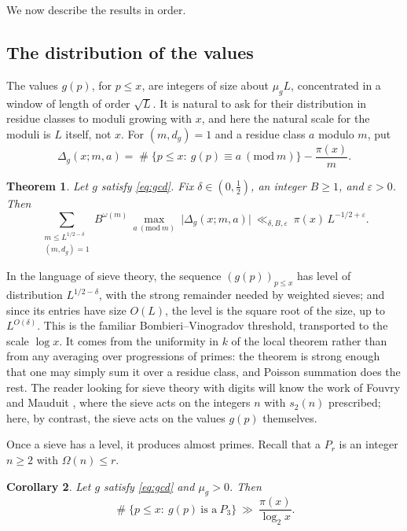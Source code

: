 \documentclass[11pt,reqno]{amsart}
\theoremstyle{plain}
\newtheorem{theorem}{Theorem}[section]
\newtheorem{corollary}[theorem]{Corollary}
\theoremstyle{definition}
\DeclareMathOperator{\Card}{\#}
\begin{document}
We now describe the results in order.

\subsection{The distribution of the values}
The values $g(p)$, for $p\le x$, are integers of size about $\mu_gL$, concentrated in a window of length of order $\sqrt L$. It is natural to ask for their distribution in residue classes to moduli growing with $x$, and here the natural scale for the moduli is $L$ itself, not $x$. For $(m,d_g)=1$ and a residue class $a$ modulo $m$, put
\[
\Delta_g(x;m,a)=\Card\{p\le x:\ g(p)\equiv a\ (\mathrm{mod}\ m)\}-\frac{\pi(x)}m .
\]

\begin{theorem}\label{thm:level}
Let $g$ satisfy \eqref{eq:gcd}. Fix $\delta\in(0,\tfrac12)$, an integer $B\ge1$, and $\varepsilon>0$. Then
\begin{equation}\label{eq:level}
\sum_{\substack{m\le L^{1/2-\delta}\\ (m,d_g)=1}}
B^{\omega(m)}\,\max_{a\ (\mathrm{mod}\ m)}\ \big|\Delta_g(x;m,a)\big|
\ \ll_{\delta,B,\varepsilon}\ \pi(x)\,L^{-1/2+\varepsilon}.
\end{equation}
\end{theorem}

In the language of sieve theory, the sequence $(g(p))_{p\le x}$ has level of distribution $L^{1/2-\delta}$, with the strong remainder needed by weighted sieves; and since its entries have size $O(L)$, the level is the square root of the size, up to $L^{O(\delta)}$. This is the familiar Bombieri--Vinogradov threshold, transported to the scale $\log x$. It comes from the uniformity in $k$ of the local theorem rather than from any averaging over progressions of primes: the theorem is strong enough that one may simply sum it over a residue class, and Poisson summation does the rest. The reader looking for sieve theory with digits will know the work of Fouvry and Mauduit \cite{fouvrymauduit-sieve,fouvrymauduit-almost}, where the sieve acts on the integers $n$ with $s_2(n)$ prescribed; here, by contrast, the sieve acts on the values $g(p)$ themselves.

Once a sieve has a level, it produces almost primes. Recall that a $P_r$ is an integer $n\ge2$ with $\Omega(n)\le r$.

\begin{corollary}\label{cor:p3}
Let $g$ satisfy \eqref{eq:gcd} and $\mu_g>0$. Then
\[
\Card\{p\le x:\ g(p)\ \text{is a}\ P_3\}\ \gg\ \frac{\pi(x)}{\log_2 x}.
\]
\end{corollary}
\end{document}
